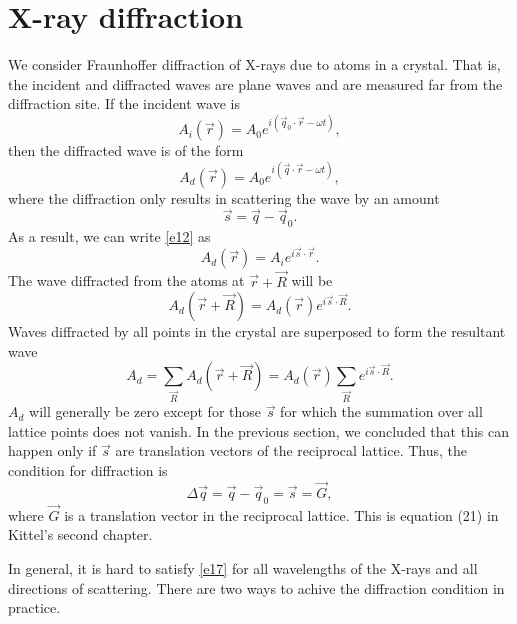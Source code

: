 \documentclass{article}
\begin{document}
\section{X-ray diffraction}
We consider Fraunhoffer diffraction of X-rays due to atoms in a crystal. That
is, the incident and diffracted waves are plane waves and are measured far from
the diffraction site. If the incident wave is
\begin{equation}\label{e11}
A_i(\vec{r}) = A_0e^{i(\vec{q}_0\cdot\vec{r} - \omega t)},
\end{equation}
then the diffracted wave is of the form
\begin{equation}\label{e12}
A_d(\vec{r}) = A_0e^{i(\vec{q}\cdot\vec{r} - \omega t)},
\end{equation}
where the diffraction only results in scattering the wave by an amount
\begin{equation}\label{e13}
\vec{s} = \vec{q} - \vec{q}_0.
\end{equation}
As a result, we can write \eqref{e12} as
\begin{equation}\label{e14}
A_d(\vec{r}) = A_i e^{i\vec{s}\cdot\vec{r}}.
\end{equation}
The wave diffracted from the atoms at $\vec{r} + \vec{R}$ will be
\begin{equation}\label{e15}
A_d(\vec{r} + \vec{R}) = A_d(\vec{r})e^{i\vec{s}\cdot\vec{R}}.
\end{equation}
Waves diffracted by all points in the crystal are superposed to form the 
resultant wave
\begin{equation}\label{e16}
A_d = \sum_{\vec{R}} A_d(\vec{r} + \vec{R}) = A_d(\vec{r})
\sum_{\vec{R}} e^{i\vec{s}\cdot\vec{R}}.
\end{equation}
$A_d$ will generally be zero except for those $\vec{s}$ for which the summation
over all lattice points does not vanish. In the previous section, we concluded
that this can happen only if $\vec{s}$ are translation vectors of the reciprocal
lattice. Thus, the condition for diffraction is
\begin{equation}\label{e17}
\Delta\vec{q} = \vec{q} - \vec{q}_0 = \vec{s} = \vec{G},
\end{equation}
where $\vec{G}$ is a translation vector in the reciprocal lattice. This is
equation (21) in Kittel's second chapter.

In general, it is hard to satisfy \eqref{e17} for all wavelengths of the X-rays
and all directions of scattering. There are two ways to achive the diffraction
condition in practice.
\end{document}
